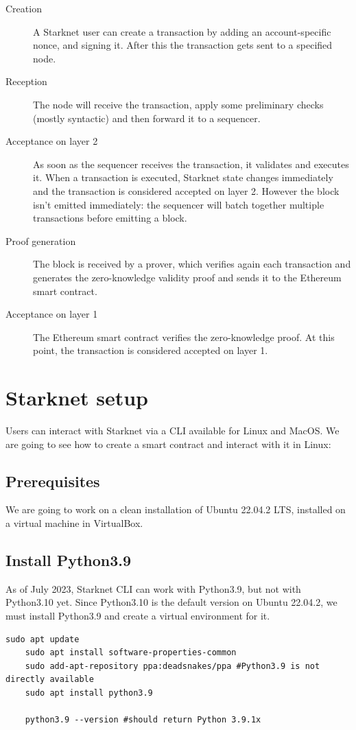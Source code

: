 \documentclass[12pt]{article}
\begin{document}
\begin{description}
    \item[Creation] A Starknet user can create a transaction by adding an account-specific nonce, and signing it. After this the transaction gets sent to a specified node.
    \item[Reception] The node will receive the transaction, apply some preliminary checks (mostly syntactic) and then forward it to a sequencer.
    \item[Acceptance on layer 2] As soon as the sequencer receives the transaction, it validates and executes it. When a transaction is executed, Starknet state changes immediately and the transaction is considered accepted on layer 2. However the block isn't emitted immediately: the sequencer will batch together multiple transactions before emitting a block.
    \item[Proof generation] The block is received by a prover, which verifies again each transaction and generates the zero-knowledge validity proof and sends it to the Ethereum smart contract.
    \item[Acceptance on layer 1] The Ethereum smart contract verifies the zero-knowledge proof. At this point, the transaction is considered accepted on layer 1.
\end{description}

\section{Starknet setup} \label{section:starknet_setup}
Users can interact with Starknet via a CLI available for Linux and MacOS. We are going to see how to create a smart contract and interact with it in Linux:

\subsection{Prerequisites} \label{subsection:prerequisites}
We are going to work on a clean installation of Ubuntu 22.04.2 LTS, installed on a virtual machine in VirtualBox.

\subsection{Install Python3.9}
As of July 2023, Starknet CLI can work with Python3.9, but not with Python3.10 yet. Since Python3.10 is the default version on Ubuntu 22.04.2, we must install Python3.9 and create a virtual environment for it.
\begin{lstlisting}[language=terminal]
    sudo apt update
    sudo apt install software-properties-common
    sudo add-apt-repository ppa:deadsnakes/ppa #Python3.9 is not directly available
    sudo apt install python3.9

    python3.9 --version #should return Python 3.9.1x
\end{lstlisting}
\end{document}
